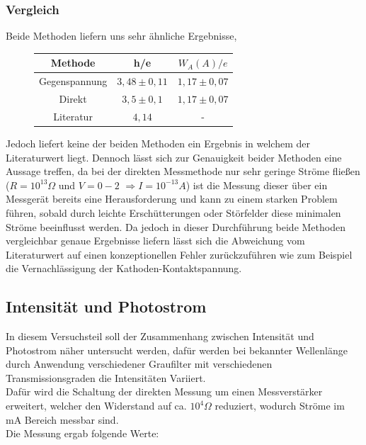 \documentclass{scrartcl}
\begin{document}
		\subsubsection{Vergleich}
			Beide Methoden liefern uns sehr ähnliche Ergebnisse,
			\begin{figure}[H]
				\centering
				\begin{tabular}{|c|c|c|}
					\hline
					Methode & h/e & $W_A(A)/e$ \\
					\hline
					Gegenspannung & $3,48\pm 0,11$ & $1,17\pm 0,07$ \\
					Direkt & $3,5\pm 0,1$ & $1,17\pm 0,07$ \\
					Literatur & $4,14$ & - \\
					\hline
				\end{tabular}
			\end{figure}

			Jedoch liefert keine der beiden Methoden ein Ergebnis in welchem der Literaturwert liegt. Dennoch lässt sich 
			zur Genauigkeit beider Methoden eine Aussage treffen, da bei der direkten Messmethode nur sehr geringe Ströme fließen
			($R=10^{13}\Omega$ und $V=0-2$ $\Rightarrow I=10^{-13}A$) ist die Messung dieser über ein Messgerät bereits eine Herausforderung
			und kann zu einem starken Problem führen, sobald durch leichte Erschütterungen oder Störfelder diese minimalen Ströme beeinflusst werden.
			Da jedoch in dieser Durchführung beide Methoden vergleichbar genaue Ergebnisse liefern lässt sich die Abweichung vom 
			Literaturwert auf einen konzeptionellen Fehler zurückzuführen wie zum Beispiel die Vernachlässigung der Kathoden-Kontaktspannung.

	\subsection{Intensität und Photostrom}
		In diesem Versuchsteil soll der Zusammenhang zwischen Intensität und Photostrom näher untersucht werden, dafür 
		werden bei bekannter Wellenlänge durch Anwendung verschiedener Graufilter mit verschiedenen Transmissionsgraden
		die Intensitäten Variiert.\\
		Dafür wird die Schaltung der direkten Messung um einen Messverstärker erweitert, welcher den Widerstand
		auf ca. $10^4 \Omega$ reduziert, wodurch Ströme im mA Bereich messbar sind.\\
		Die Messung ergab folgende Werte:
		
\end{document}
